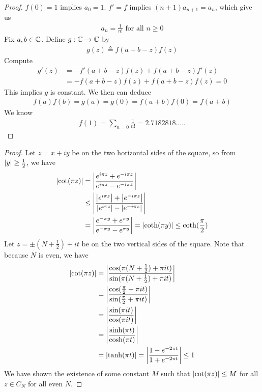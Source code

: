 \documentclass{report}
\begin{document}
\begin{proof}
$f(0)=1$ implies $a_0=1$.  $f'=f$ implies  $(n+1)a_{n+1}=a_n$, which give us 
\begin{align*}
a_n= \frac{1}{n!}\text{ for all }n\geq 0
\end{align*}
Fix $a,b \in\mathbb{C}$. Define $g:\mathbb{C}\rightarrow \mathbb{C}$ by 
\begin{align*}
g(z)\triangleq f(a+b-z)f(z)
\end{align*}
Compute 
\begin{align*}
g'(z)&=-f'(a+b-z)f(z)+f(a+b-z)f'(z)\\
&=-f(a+b-z)f(z)+f(a+b-z)f(z)=0
\end{align*}
This implies $g$ is constant. We then can deduce 
\begin{align*}
f(a)f(b)=g(a)=g(0)=f(a+b)f(0)=f(a+b)
\end{align*}
We know 
\begin{align*}
f(1)=\sum_{n=0} \frac{1}{n!}=2.7182818.....
\end{align*}
\end{proof}
\begin{proof}
Let $z=x+iy$ be on the two horizontal sides of the square, so from  $\left|y\right|\geq \frac{1}{2}$, we have 
\begin{align*}
\left|\cot (\pi  z)\right|&= \left|\frac{e^{ i \pi  z}+ e^{- i \pi  z}}{e^{i \pi  z}-e^{- i \pi  z}}\right| \\
 &\leq \left|\frac{\left|e^{i \pi  z}\right|+ \left|e^{- i \pi  z}\right|}{ \left|e^{i \pi  z}\right|-\left| e^{- i \pi  z}\right|}\right| \\
 &= \left|\frac{e^{-\pi  y}+ e^{\pi  y}}{e^{-\pi y}- e^{\pi y}}\right|= \left|\coth (\pi  y)\right|\leq  \coth (\frac{\pi }{2})
\end{align*}
Let $z= \pm (N+ \frac{1}{2})+ it$ be on the two vertical sides of the square. Note that because $N$ is even, we have 
\begin{align*}
\left|\cot (\pi  z)\right|&= \left|\frac{\cos (\pi  (N+ \frac{1}{2})+ \pi it )}{\sin (\pi  (N+ \frac{1}{2})+ \pi it )}\right| \\
&= \left| \frac{\cos (\frac{\pi }{2}+ \pi  it)}{\sin (\frac{\pi}{2}+ \pi  it)}\right| \\
&=\left|\frac{\sin (\pi  it)}{\cos (\pi  it)}\right|\\
&=\left|\frac{\sinh (\pi t)}{\cosh (\pi  t)}\right|\\
&=\left|\tanh (\pi t)\right|= \left|\frac{1- e^{-2\pi t}}{1+e^{-2\pi t}}\right|\leq 1
\end{align*}
We have shown the existence of some constant $M$ such that  $\left|\cot (\pi z)\right|\leq M$ for all $z\in C_N$ for all even $N$.  
\end{proof}
\end{document}
